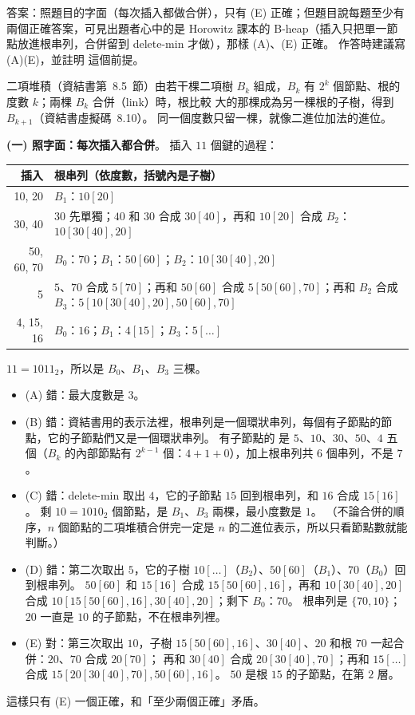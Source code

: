 \begin{pastsoln}
答案：照題目的字面（每次插入都做合併），只有 (E) 正確；但題目說每題至少有兩個正確答案，可見出題者心中的是 Horowitz
課本的 B-heap（插入只把單一節點放進根串列，合併留到 delete-min 才做），那樣 (A)、(E) 正確。 作答時建議寫 (A)(E)，並註明
這個前提。

二項堆積（資結書第~8.5~節）由若干棵二項樹 $B_k$ 組成，$B_k$ 有 $2^k$ 個節點、根的度數 $k$；兩棵 $B_k$ 合併（link）時，根比較
大的那棵成為另一棵根的子樹，得到 $B_{k+1}$（資結書虛擬碼~8.10）。 同一個度數只留一棵，就像二進位加法的進位。

\textbf{(一) 照字面：每次插入都合併}。 插入 $11$ 個鍵的過程：
\begin{center}
\small
\begin{tabular}{rp{11.5cm}}
\toprule
插入 & 根串列（依度數，括號內是子樹） \\
\midrule
10, 20 & $B_1$：$10[20]$ \\
30, 40 & $30$ 先單獨；$40$ 和 $30$ 合成 $30[40]$，再和 $10[20]$ 合成 $B_2$：$10[30[40], 20]$ \\
50, 60, 70 & $B_0$：$70$；$B_1$：$50[60]$；$B_2$：$10[30[40], 20]$ \\
5 & $5$、$70$ 合成 $5[70]$；再和 $50[60]$ 合成 $5[50[60], 70]$；再和 $B_2$ 合成 $B_3$：$5[10[30[40], 20], 50[60], 70]$ \\
4, 15, 16 & $B_0$：$16$；$B_1$：$4[15]$；$B_3$：$5[\ldots]$ \\
\bottomrule
\end{tabular}
\end{center}
$11 = 1011_2$，所以是 $B_0$、$B_1$、$B_3$ 三棵。
\begin{itemize}
\item (A) 錯：最大度數是 $3$。
\item (B) 錯：資結書用的表示法裡，根串列是一個環狀串列，每個有子節點的節點，它的子節點們又是一個環狀串列。 有子節點的
是 $5$、$10$、$30$、$50$、$4$ 五個（$B_k$ 的內部節點有 $2^{k-1}$ 個：$4 + 1 + 0$），加上根串列共 $6$ 個串列，不是 $7$。
\item (C) 錯：delete-min 取出 $4$，它的子節點 $15$ 回到根串列，和 $16$ 合成 $15[16]$。 剩 $10 = 1010_2$ 個節點，是 $B_1$、$B_3$
兩棵，最小度數是 $1$。 （不論合併的順序，$n$ 個節點的二項堆積合併完一定是 $n$ 的二進位表示，所以只看節點數就能判斷。）
\item (D) 錯：第二次取出 $5$，它的子樹 $10[\ldots]$（$B_2$）、$50[60]$（$B_1$）、$70$（$B_0$）回到根串列。 $50[60]$ 和
$15[16]$ 合成 $15[50[60], \allowbreak 16]$，再和 $10[30[40], 20]$ 合成 $10[15[50[60], \allowbreak 16], 30[40], 20]$；剩下 $B_0$：$70$。 根串列是
$\{70, 10\}$；$20$ 一直是 $10$ 的子節點，不在根串列裡。
\item (E) 對：第三次取出 $10$，子樹 $15[50[60], \allowbreak 16]$、$30[40]$、$20$ 和根 $70$ 一起合併：$20$、$70$ 合成 $20[70]$；
再和 $30[40]$ 合成 $20[30[40], 70]$；再和 $15[\ldots]$ 合成 $15[20[30[40], 70], 50[60], \allowbreak 16]$。 $50$ 是根 $15$ 的子節點，在第 $2$ 層。
\end{itemize}
這樣只有 (E) 一個正確，和「至少兩個正確」矛盾。


\end{pastsoln}
